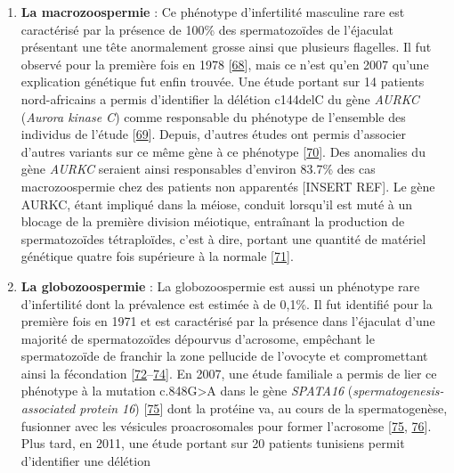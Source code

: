 \documentclass[12pt,a4paper,twoside]{ugathesis}
\providecommand{\tightlist}{%
  \setlength{\itemsep}{0pt}\setlength{\parskip}{0pt}}
\theoremstyle{definition}
\theoremstyle{definition}
\theoremstyle{definition}
\theoremstyle{remark}
\begin{document}
\begin{enumerate}
  \begin{enumerate}
  \def\labelenumii{\alph{enumii}.}
  \tightlist
  \item
    \textbf{La macrozoospermie} : Ce phénotype d'infertilité masculine
    rare est caractérisé par la présence de 100\% des spermatozoïdes de
    l'éjaculat présentant une tête anormalement grosse ainsi que
    plusieurs flagelles. Il fut observé pour la première fois en 1978
    {[}\protect\hyperlink{ref-Nistal}{68}{]}, mais ce n'est qu'en 2007
    qu'une explication génétique fut enfin trouvée. Une étude portant
    sur 14 patients nord-africains a permis d'identifier la délétion
    c144delC du gène \emph{AURKC} (\emph{Aurora kinase C}) comme
    responsable du phénotype de l'ensemble des individus de l'étude
    {[}\protect\hyperlink{ref-Dieterich2007}{69}{]}. Depuis, d'autres
    études ont permis d'associer d'autres variants sur ce même gène à ce
    phénotype {[}\protect\hyperlink{ref-BenKhelifa2011}{70}{]}. Des
    anomalies du gène \emph{AURKC} seraient ainsi responsables d'environ
    83.7\% des cas macrozoospermie chez des patients non apparentés
    {[}INSERT REF{]}. Le gène AURKC, étant impliqué dans la méiose,
    conduit lorsqu'il est muté à un blocage de la première division
    méiotique, entraînant la production de spermatozoïdes tétraploïdes,
    c'est à dire, portant une quantité de matériel génétique quatre fois
    supérieure à la normale
    {[}\protect\hyperlink{ref-Dieterich2009}{71}{]}.\\
  \item
    \textbf{La globozoospermie} : La globozoospermie est aussi un
    phénotype rare d'infertilité dont la prévalence est estimée à de
    0,1\%. Il fut identifié pour la première fois en 1971 et est
    caractérisé par la présence dans l'éjaculat d'une majorité de
    spermatozoïdes dépourvus d'acrosome, empêchant le spermatozoïde de
    franchir la zone pellucide de l'ovocyte et compromettant ainsi la
    fécondation
    {[}\protect\hyperlink{ref-Dam2006}{72}--\protect\hyperlink{ref-Holstein1973}{74}{]}.
    En 2007, une étude familiale a permis de lier ce phénotype à la
    mutation c.848G\textgreater{}A dans le gène \emph{SPATA16}
    (\emph{spermatogenesis-associated protein 16})
    {[}\protect\hyperlink{ref-Dam2007a}{75}{]} dont la protéine va, au
    cours de la spermatogenèse, fusionner avec les vésicules
    proacrosomales pour former l'acrosome
    {[}\protect\hyperlink{ref-Dam2007a}{75},
    \protect\hyperlink{ref-Lu2006}{76}{]}. Plus tard, en 2011, une étude
    portant sur 20 patients tunisiens permit d'identifier une délétion

\end{enumerate}
\end{enumerate}
\end{document}
